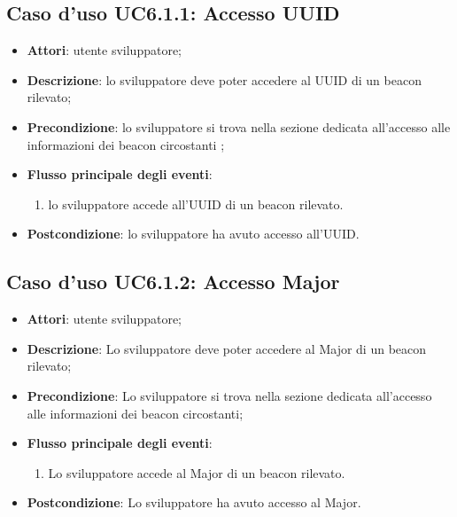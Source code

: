 \documentclass[../AnalisiDeiRequisiti.tex]{subfiles}
\begin{document}
\subsection{Caso d'uso UC6.1.1: Accesso UUID}
\begin{itemize}
	\item \textbf{Attori}: utente sviluppatore;
	\item \textbf{Descrizione}: lo sviluppatore deve poter accedere al UUID di un beacon rilevato; 
	\item \textbf{Precondizione}: lo sviluppatore si trova nella sezione dedicata all'accesso alle informazioni dei beacon circostanti ;
	
	\item \textbf{Flusso principale degli eventi}:
	\begin{enumerate}
		\item lo sviluppatore accede all'UUID di un beacon rilevato.
		
	\end{enumerate}
	\item \textbf{Postcondizione}: lo sviluppatore ha avuto accesso all'UUID.
\end{itemize}
\hypertarget{UC6.1.2}{}
\subsection{Caso d'uso UC6.1.2: Accesso Major}
\begin{itemize}
	\item \textbf{Attori}: utente sviluppatore;
	\item \textbf{Descrizione}: Lo sviluppatore deve poter accedere al Major di un beacon rilevato; 
	\item \textbf{Precondizione}: Lo sviluppatore si trova nella sezione dedicata all'accesso alle informazioni dei beacon circostanti;
	
	\item \textbf{Flusso principale degli eventi}:
	\begin{enumerate}
		\item Lo sviluppatore accede al Major di un beacon rilevato.
		
	\end{enumerate}
	\item \textbf{Postcondizione}: Lo sviluppatore ha avuto accesso al Major.
\end{itemize}
\hypertarget{UC6.1.3}{}
\end{document}

